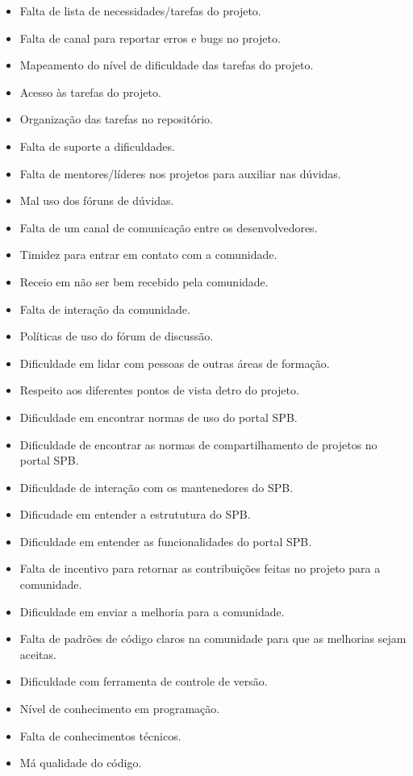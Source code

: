 \begin{itemize}
%
\item Falta de lista de necessidades/tarefas do projeto.
\item Falta de canal para reportar erros e bugs no projeto.
\item Mapeamento do nível de dificuldade das tarefas do projeto.
\item Acesso às tarefas do projeto.
\item Organização das tarefas no repositório.
%
\item Falta de suporte a dificuldades.
\item Falta de mentores/líderes nos projetos para auxiliar nas dúvidas.
\item Mal uso dos fóruns de dúvidas.
\item Falta de um canal de comunicação entre os desenvolvedores.
\item Timidez para entrar em contato com a comunidade.
\item Receio em não ser bem recebido pela comunidade.
\item Falta de interação da comunidade.
\item Políticas de uso do fórum de discussão.
\item Dificuldade em lidar com pessoas de outras áreas de formação.
\item Respeito aos diferentes pontos de vista detro do projeto.
%
\item Dificuldade em encontrar normas de uso do portal SPB.
\item Dificuldade de encontrar as normas de compartilhamento de projetos no portal SPB.
\item Dificuldade de interação com os mantenedores do SPB.
\item Dificudade em entender a estrututura do SPB.
\item Dificuldade em entender as funcionalidades do portal SPB.
%
\item Falta de incentivo para retornar as contribuições feitas no projeto para a comunidade.
\item Dificuldade em enviar a melhoria para a comunidade.
\item Falta de padrões de código claros na comunidade para que as melhorias sejam aceitas.
%
\item Dificuldade com ferramenta de controle de versão.
\item Nível de conhecimento em programação.
\item Falta de conhecimentos técnicos.
%
\item Má qualidade do código.

\end{itemize}
